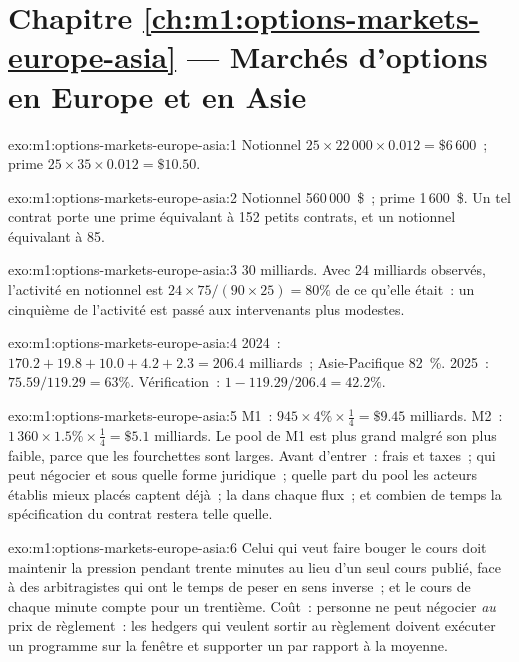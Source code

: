 \section*{Chapitre \ref{ch:m1:options-markets-europe-asia} --- Marchés d'options en Europe et en Asie}

\begin{solution}{exo:m1:options-markets-europe-asia:1}
Notionnel $25 \times 22\,000 \times 0.012 = \$6\,600$~; prime $25 \times 35 \times
0.012 = \$10.50$.
\end{solution}

\begin{solution}{exo:m1:options-markets-europe-asia:2}
Notionnel 560\,000~\$~; prime 1\,600~\$. Un tel contrat porte une prime
équivalant à 152 petits contrats, et un notionnel équivalant à 85.
\end{solution}

\begin{solution}{exo:m1:options-markets-europe-asia:3}
30 milliards. Avec 24 milliards observés, l'activité en notionnel est $24 \times 75/(90
\times 25) = 80\%$ de ce qu'elle était~: un cinquième de l'activité
est passé aux intervenants plus modestes.
\end{solution}

\begin{solution}{exo:m1:options-markets-europe-asia:4}
2024~: $170.2 + 19.8 + 10.0 + 4.2 + 2.3 = 206.4$ milliards~; Asie-Pacifique 82~\%.
2025~: $75.59/119.29 = 63\%$. Vérification~: $1 - 119.29/206.4 = 42.2\%$.
\end{solution}

\begin{solution}{exo:m1:options-markets-europe-asia:5}
M1~: $945 \times 4\% \times \tfrac14 = \$9.45$ milliards. M2~: $1\,360 \times 1.5\%
\times \tfrac14 = \$5.1$ milliards. Le pool de M1 est plus grand malgré son
 plus faible, parce que les fourchettes sont larges. Avant d'entrer~: frais et taxes~;
qui peut négocier et sous quelle forme juridique~; quelle part du pool les
acteurs établis mieux placés captent déjà~; la  dans chaque flux~; et
combien de temps la spécification du contrat restera telle quelle.
\end{solution}

\begin{solution}{exo:m1:options-markets-europe-asia:6}
Celui qui veut faire bouger le cours doit maintenir la pression pendant trente minutes au lieu d'un seul cours publié,
face à des arbitragistes qui ont le temps de peser en sens inverse~; et le cours de chaque
minute compte pour un trentième. Coût~: personne ne peut négocier \emph{au} prix de
règlement~: les hedgers qui veulent sortir au règlement doivent exécuter un
programme sur la fenêtre et supporter un  par rapport à la moyenne.
\end{solution}

